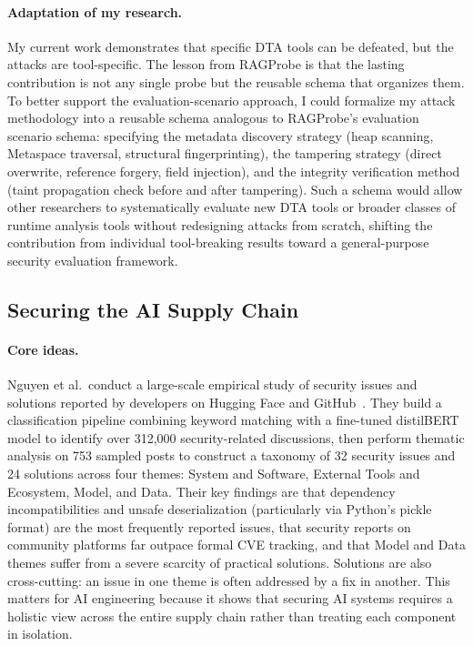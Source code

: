 \documentclass[a4paper,11pt]{article}
\theoremstyle{plain}
\begin{document}
\paragraph{Adaptation of my research.}
My current work demonstrates that specific DTA tools can be defeated, but the attacks are tool-specific. The lesson from RAGProbe is that the lasting contribution is not any single probe but the reusable schema that organizes them.
To better support the evaluation-scenario approach, I could formalize my attack methodology into a reusable schema analogous to RAGProbe's evaluation scenario schema: specifying the metadata discovery strategy (heap scanning, Metaspace traversal, structural fingerprinting), the tampering strategy (direct overwrite, reference forgery, field injection), and the integrity verification method (taint propagation check before and after tampering). Such a schema would allow other researchers to systematically evaluate new DTA tools or broader classes of runtime analysis tools without redesigning attacks from scratch, shifting the contribution from individual tool-breaking results toward a general-purpose security evaluation framework.

\subsection{Securing the AI Supply Chain}

\paragraph{Core ideas.}
Nguyen et al.\ conduct a large-scale empirical study of security issues and solutions reported by developers on Hugging Face and GitHub~\cite{nguyen2026supplychain}. They build a classification pipeline combining keyword matching with a fine-tuned distilBERT model to identify over 312,000 security-related discussions, then perform thematic analysis on 753 sampled posts to construct a taxonomy of 32 security issues and 24 solutions across four themes: System and Software, External Tools and Ecosystem, Model, and Data. Their key findings are that dependency incompatibilities and unsafe deserialization (particularly via Python's pickle format) are the most frequently reported issues, that security reports on community platforms far outpace formal CVE tracking, and that Model and Data themes suffer from a severe scarcity of practical solutions. Solutions are also cross-cutting: an issue in one theme is often addressed by a fix in another. This matters for AI engineering because it shows that securing AI systems requires a holistic view across the entire supply chain rather than treating each component in isolation.
\end{document}
